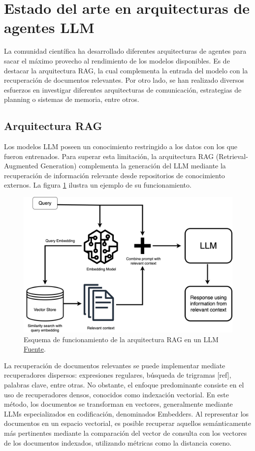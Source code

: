 \section{Estado del arte en arquitecturas de agentes LLM}

La comunidad científica ha desarrollado diferentes arquitecturas de agentes para sacar el máximo provecho al rendimiento de los modelos disponibles. Es de destacar la arquitectura RAG, la cual complementa la entrada del modelo con la recuperación de documentos relevantes. Por otro lado, se han realizado diversos esfuerzos en investigar diferentes arquitecturas de comunicación, estrategias de planning o sistemas de memoria, entre otros.

\subsection{Arquitectura RAG}

Los modelos LLM poseen un conocimiento restringido a los datos con los que fueron entrenados. Para superar esta limitación, la arquitectura RAG (Retrieval-Augmented Generation) complementa la generación del LLM mediante la recuperación de información relevante desde repositorios de conocimiento externos. La figura \ref{fig:rag} ilustra un ejemplo de su funcionamiento.    

\begin{figure}
  \centering
  \includegraphics[width=0.5\linewidth]{figures/RAG.png}
  \caption{Esquema de funcionamiento de la arquitectura RAG en un LLM \href{https://www.clarifai.com/blog/what-is-rag-retrieval-augmented-generation}{Fuente}.}
  \label{fig:rag}
\end{figure}

La recuperación de documentos relevantes se puede implementar mediate recuperadores dispersos: expresiones regulares, búsqueda de trigramas [ref], palabras clave, entre otras. No obstante, el enfoque predominante consiste en el uso de recuperadores densos, conocidos como indexación vectorial. En este método, los documentos se transforman en vectores, generalmente mediante LLMs especializados en codificación, denominados Embedders. Al representar los documentos en un espacio vectorial, es posible recuperar aquellos semánticamente más pertinentes mediante la comparación del vector de consulta con los vectores de los documentos indexados, utilizando métricas como la distancia coseno.

